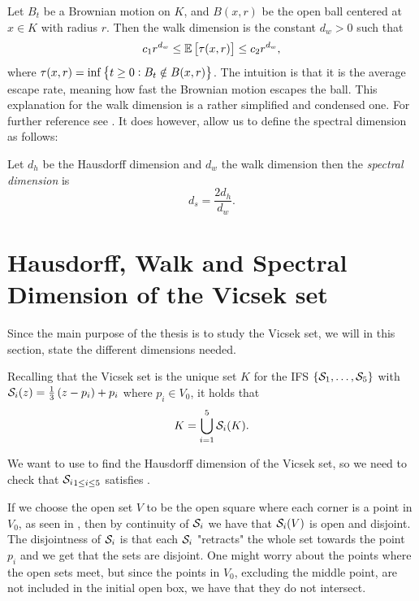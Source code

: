 \medskip
Let $B_t$ be a Brownian motion on $K$, and $B(x,r)$ be the open ball centered at $x \in K$ with radius $r$. Then the walk dimension is the constant $d_w > 0$ such that
\begin{equation}
	c_1 r^{d_w} \leq \mathbb{E} \left[\tau(x,r)\right] \leq c_2 r^{d_w},
\end{equation}
where $\tau(x,r) = \inf\cbr{t \geq 0 : B_t \notin B(x,r)}$.  The intuition is that it is the average escape rate, meaning how fast the Brownian motion escapes the ball. This explanation for the walk dimension is a rather simplified and condensed one. For further reference see \cite[Chapter 3]{barlow}. It does however, allow us to define the spectral dimension as follows:
\medskip
\begin{defi}\label{spectralDimDefi}
	Let $d_h$ be the Hausdorff dimension and $d_w$ the walk dimension then the \emph{spectral dimension} is
	\begin{equation}
		d_s = \frac{2 d_h}{d_w}.
	\end{equation}
\end{defi}

\section[Hausdorff, Walk and Spectral Dimension of the Vicsek set]{Hausdorff, Walk and Spectral \\ Dimension of the Vicsek set}

Since the main purpose of the thesis is to study the Vicsek set, we will in this section, state the different dimensions needed. 

Recalling that the Vicsek set is the unique set $K$ for the IFS $\cbr{\fracConst_1, \ldots, \fracConst_{5}}$ with \nl $\mathcal{S}_{i}(z) = \frac{1}{3}\left(z -p_i\right) + p_i$ where $p_i \in V_0$, it holds that
\begin{equation}
	K = \bigcup_{i =1}^{5} \mathcal{S}_{i}(K).
\end{equation}

We want to use  to find the Hausdorff dimension of the Vicsek set, so we need to check that ${\mathcal{S}_i}_{1 \leq i \leq 5}$ satisfies . 

If we choose the open set $V$ to be the open square where each corner is a point in $V_0$, as seen in , then by continuity of $\mathcal{S}_{i}$ we have that $\mathcal{S}_{i}(V)$ is open and disjoint. The disjointness of $\mathcal{S}_{i}$ is that each $\mathcal{S}_{i}$ "retracts" the whole set towards the point $p_i$ and we get that the sets are disjoint. One might worry about the points where the open sets meet, but since the points in $V_0$, excluding the middle point, are not included in the initial open box, we have that they do not intersect.

